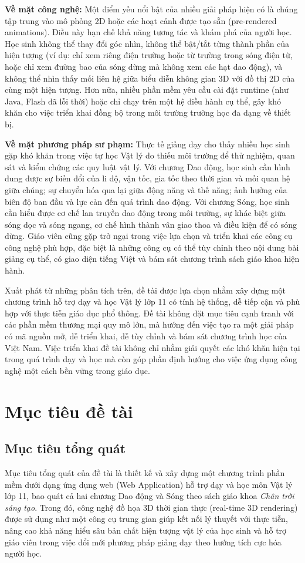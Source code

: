 \textbf{Về mặt công nghệ:} Một điểm yếu nổi bật của nhiều giải pháp hiện có là chúng tập trung vào mô phỏng 2D hoặc các hoạt cảnh được tạo sẵn (pre-rendered animations). Điều này hạn chế khả năng tương tác và khám phá của người học. Học sinh không thể thay đổi góc nhìn, không thể bật/tắt từng thành phần của hiện tượng (ví dụ: chỉ xem riêng điện trường hoặc từ trường trong sóng điện từ, hoặc chỉ xem đường bao của sóng dừng mà không xem các hạt dao động), và không thể nhìn thấy mối liên hệ giữa biểu diễn không gian 3D với đồ thị 2D của cùng một hiện tượng. Hơn nữa, nhiều phần mềm yêu cầu cài đặt runtime (như Java, Flash đã lỗi thời) hoặc chỉ chạy trên một hệ điều hành cụ thể, gây khó khăn cho việc triển khai đồng bộ trong môi trường trường học đa dạng về thiết bị.

\textbf{Về mặt phương pháp sư phạm:} Thực tế giảng dạy cho thấy nhiều học sinh gặp khó khăn trong việc tự học Vật lý do thiếu môi trường để thử nghiệm, quan sát và kiểm chứng các quy luật vật lý. Với chương Dao động, học sinh cần hình dung được sự biến đổi của li độ, vận tốc, gia tốc theo thời gian và mối quan hệ giữa chúng; sự chuyển hóa qua lại giữa động năng và thế năng; ảnh hưởng của biên độ ban đầu và lực cản đến quá trình dao động. Với chương Sóng, học sinh cần hiểu được cơ chế lan truyền dao động trong môi trường, sự khác biệt giữa sóng dọc và sóng ngang, cơ chế hình thành vân giao thoa và điều kiện để có sóng dừng. Giáo viên cũng gặp trở ngại trong việc lựa chọn và triển khai các công cụ công nghệ phù hợp, đặc biệt là những công cụ có thể tùy chỉnh theo nội dung bài giảng cụ thể, có giao diện tiếng Việt và bám sát chương trình sách giáo khoa hiện hành.

Xuất phát từ những phân tích trên, đề tài được lựa chọn nhằm xây dựng một chương trình hỗ trợ dạy và học Vật lý lớp 11 có tính hệ thống, dễ tiếp cận và phù hợp với thực tiễn giáo dục phổ thông. Đề tài không đặt mục tiêu cạnh tranh với các phần mềm thương mại quy mô lớn, mà hướng đến việc tạo ra một giải pháp có mã nguồn mở, dễ triển khai, dễ tùy chỉnh và bám sát chương trình học của Việt Nam. Việc triển khai đề tài không chỉ nhằm giải quyết các khó khăn hiện tại trong quá trình dạy và học mà còn góp phần định hướng cho việc ứng dụng công nghệ một cách bền vững trong giáo dục.

\section{Mục tiêu đề tài}

\subsection{Mục tiêu tổng quát}
Mục tiêu tổng quát của đề tài là thiết kế và xây dựng một chương trình phần mềm dưới dạng ứng dụng web (Web Application) hỗ trợ dạy và học môn Vật lý lớp 11, bao quát cả hai chương Dao động và Sóng theo sách giáo khoa \textit{Chân trời sáng tạo}. Trong đó, công nghệ đồ họa 3D thời gian thực (real-time 3D rendering) được sử dụng như một công cụ trung gian giúp kết nối lý thuyết với thực tiễn, nâng cao khả năng hiểu sâu bản chất hiện tượng vật lý của học sinh và hỗ trợ giáo viên trong việc đổi mới phương pháp giảng dạy theo hướng tích cực hóa người học.

